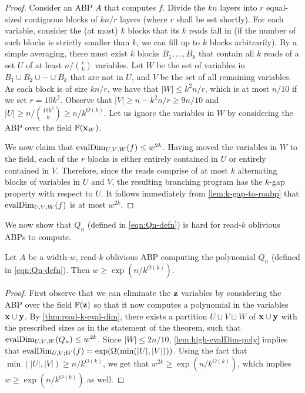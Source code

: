 \documentclass[11pt]{article}
\begin{document}
\begin{proof}
Consider an ABP $A$ that computes $f$.
Divide the $kn$ layers into $r$ equal-sized contiguous blocks of $kn/r$ layers (where $r$ shall be set shortly).
For each variable, consider the (at most) $k$ blocks that its $k$ reads fall in (if the number of such blocks is strictly smaller than $k$, we can fill up to $k$ blocks arbitrarily).
By a simple averaging, there must exist $k$ blocks $B_1,\ldots, B_k$ that contain all $k$ reads of a set $U$ of at least $n / \binom{r}{k}$ variables.
Let $W$ be the set of variables in $B_1 \cup B_2 \cup \cdots \cup B_k$ that are not in $U$, and $V$ be the set of all remaining variables.
As each block is of size $kn/r$, we have that $|W| \le k^2n/r$, which is at most $n/10$ if we set $r=10k^2$.  
Observe that $|V| \ge n - k^2n/r \ge 9n/10$ and $|U| \ge n / \binom{10k^2}{k} \ge n / k^{O(k)}$.
Let us ignore the variables in $W$ by considering the ABP over the field $\F(\vecx_W)$.

We now claim that $\operatorname{evalDim}_{U,V;W}(f) \leq w^{2k}$. 
Having moved the variables in $W$ to the field, each of the $r$ blocks is either entirely contained in $U$ or entirely contained in $V$.
Therefore, since the reads comprise of at most $k$ alternating blocks of variables in $U$ and $V$, the resulting branching program has the $k$-gap property with respect to $U$. It follows immediately from \autoref{lem:k-gap-to-roabp} that $\operatorname{evalDim}_{U,V;W}(f)$ is at most $w^{2k}$. 
\end{proof}

We now show that $Q_n$ (defined in \eqref{eqn:Qn-defn}) is hard for read-$k$ oblivious ABPs to compute.

\begin{theorem}
\label{thm:poly-hard-for-read-k}
Let $A$ be a width-$w$, read-$k$ oblivious ABP computing the polynomial $Q_n$ (defined in \eqref{eqn:Qn-defn}). Then $w \ge \exp(n/k^{O(k)})$. 
\end{theorem}
\begin{proof}
First observe that we can eliminate the $\mathbf{z}$ variables by considering the ABP over the field $\F(\vecz)$
so that it now computes 
a polynomial in the variables $\mathbf{x} \cup \mathbf{y}$.
By \autoref{thm:read-k-eval-dim}, there exists a partition $U \sqcup V \sqcup W$ of $\mathbf{x} \cup \mathbf{y}$ with the prescribed sizes as in the statement of the theorem, such that $\operatorname{evalDim}_{U,V;W}(Q_n) \leq w^{2k}$.
Since $|W| \le 2n/10$, \autoref{lem:high-evalDim-poly} implies that 
$\operatorname{evalDim}_{U,V;W}(f) = \exp(\Omega(\min(|U|,|V|)))$.
Using the fact that $\min(|U|, |V|) \geq n/k^{O(k)}$, we get that $w^{2k} \ge \exp(n/k^{O(k)})$, which implies $w \ge \exp(n/k^{O(k)})$ as well.
\end{proof}
\end{document}
